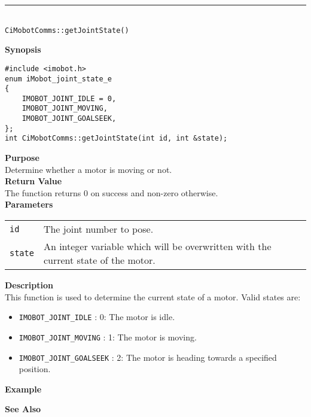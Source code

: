 \noindent
\vspace{5pt}
\rule{4.5in}{0.015in}\\
\noindent
{\LARGE \texttt{CiMobotComms::getJointState()}}\\
{}

\noindent
{\bf Synopsis}\\
\begin{verbatim}
#include <imobot.h>
enum iMobot_joint_state_e
{
    IMOBOT_JOINT_IDLE = 0,
    IMOBOT_JOINT_MOVING,
    IMOBOT_JOINT_GOALSEEK,
};
int CiMobotComms::getJointState(int id, int &state);
\end{verbatim}

\noindent
{\bf Purpose}\\
Determine whether a motor is moving or not.\\

\noindent
{\bf Return Value}\\
The function returns 0 on success and non-zero otherwise.\\

\noindent
{\bf Parameters}
\vspace{-0.1in}
\begin{description}
\item               
\begin{tabular}{p{10 mm}p{145 mm}}
\texttt{id} & The joint number to pose. \\
\texttt{state} & An integer variable which will be overwritten with the current state of the motor. 
\end{tabular}
\end{description}

\noindent
{\bf Description}\\
This function is used to determine the current state of a motor. Valid states are:
\begin{itemize}
\item \texttt{IMOBOT\_JOINT\_IDLE} : 0: The motor is idle.
\item \texttt{IMOBOT\_JOINT\_MOVING} : 1: The motor is moving.
\item \texttt{IMOBOT\_JOINT\_GOALSEEK} : 2: The motor is heading towards a specified position.
\end{itemize}

\noindent
{\bf Example}\\
\noindent

\noindent
{\bf See Also}\\

